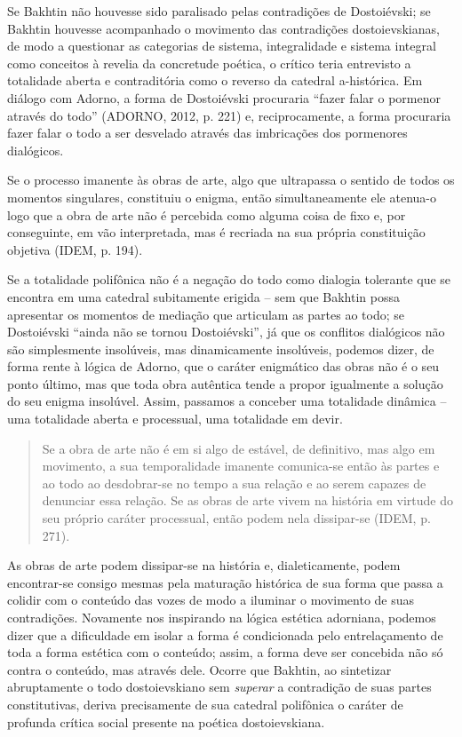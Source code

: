 Se Bakhtin não houvesse sido paralisado pelas contradições de
Dostoiévski; se Bakhtin houvesse acompanhado o movimento das
contradições dostoievskianas, de modo a questionar as categorias de
sistema, integralidade e sistema integral como conceitos à revelia da
concretude poética, o crítico teria entrevisto a totalidade aberta e
contraditória como o reverso da catedral a-histórica. Em diálogo com
Adorno, a forma de Dostoiévski procuraria ``fazer falar o pormenor
através do todo'' (ADORNO, 2012, p. 221) e, reciprocamente, a forma
procuraria fazer falar o todo a ser desvelado através das imbricações
dos pormenores dialógicos.

Se o processo imanente às obras de arte, algo que ultrapassa o sentido
de todos os momentos singulares, constituiu o enigma, então
simultaneamente ele atenua-o logo que a obra de arte não é percebida
como alguma coisa de fixo e, por conseguinte, em vão interpretada, mas é
recriada na sua própria constituição objetiva (IDEM, p. 194).

Se a totalidade polifônica não é a negação do todo como dialogia
tolerante que se encontra em uma catedral subitamente erigida -- sem que
Bakhtin possa apresentar os momentos de mediação que articulam as partes
ao todo; se Dostoiévski ``ainda não se tornou Dostoiévski'', já que os
conflitos dialógicos não são simplesmente insolúveis, mas dinamicamente
insolúveis, podemos dizer, de forma rente à lógica de Adorno, que o
caráter enigmático das obras não é o seu ponto último, mas que toda obra
autêntica tende a propor igualmente a solução do seu enigma insolúvel.
Assim, passamos a conceber uma totalidade dinâmica -- uma totalidade
aberta e processual, uma totalidade em devir.

\begin{quote}
Se a obra de arte não é em si algo de estável, de definitivo, mas algo
em movimento, a sua temporalidade imanente comunica-se então às partes e
ao todo ao desdobrar-se no tempo a sua relação e ao serem capazes de
denunciar essa relação. Se as obras de arte vivem na história em virtude
do seu próprio caráter processual, então podem nela dissipar-se (IDEM,
p. 271).
\end{quote}

As obras de arte podem dissipar-se na história e, dialeticamente, podem
encontrar-se consigo mesmas pela maturação histórica de sua forma que
passa a colidir com o conteúdo das vozes de modo a iluminar o movimento
de suas contradições. Novamente nos inspirando na lógica estética
adorniana, podemos dizer que a dificuldade em isolar a forma é
condicionada pelo entrelaçamento de toda a forma estética com o
conteúdo; assim, a forma deve ser concebida não só contra o conteúdo,
mas através dele. Ocorre que Bakhtin, ao sintetizar abruptamente o todo
dostoievskiano sem \emph{superar} a contradição de suas partes
constitutivas, deriva precisamente de sua catedral polifônica o caráter
de profunda crítica social presente na poética dostoievskiana.

